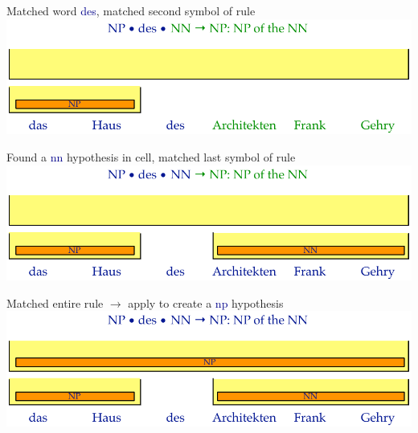 \documentclass[landscape]{slides}
\newcommand{\example}[1]{\textcolor{darkblue}{\rm #1}}
\begin{document}

\vspace{20mm}
\begin{center}
Matched word \example{des}, matched second symbol of rule\\[20mm]
\includegraphics[scale=1.6]{rule-lookup4.pdf}
\end{center}


\vspace{20mm}
\begin{center}
Found a \example{\sc nn} hypothesis in cell, matched last symbol of rule\\[20mm]
\includegraphics[scale=1.6]{rule-lookup5.pdf}
\end{center}


\vspace{20mm}
\begin{center}
Matched entire rule $\rightarrow$ apply to create a \example{\sc np} hypothesis\\[20mm]
\includegraphics[scale=1.6]{rule-lookup6.pdf}
\end{center}
\end{document}
